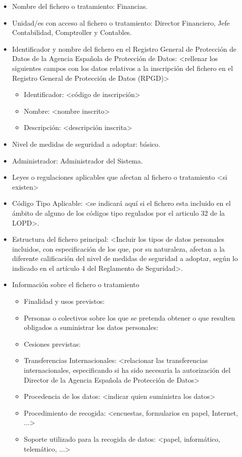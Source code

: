 \documentclass[a4paper,11pt,bibtotoc,noliststotoc]{scrbook}
\begin{document}
\begin{itemize}
\item Nombre del fichero o tratamiento: Financias.

\item Unidad/es con acceso al fichero o tratamiento: Director Financiero, Jefe Contabilidad, Comptroller y Contables.

\item Identificador y nombre del fichero en el Registro General de Protección de Datos de la Agencia Española de Protección de Datos: <rellenar los siguientes campos con los datos relativos a la inscripción del fichero en el Registro General de Protección de Datos (RPGD)>
	\begin{itemize}
	\item Identificador: <código de inscripción>
	\item Nombre: <nombre inscrito>
	\item Descripción: <descripción inscrita>
	\end{itemize}

\item Nivel de medidas de seguridad a adoptar: básico.

\item Administrador: Administrador del Sistema.

\item Leyes o regulaciones aplicables que afectan al fichero o tratamiento <si existen>

\item Código Tipo Aplicable: <se indicará aquí si el fichero esta incluido en el ámbito de alguno de los códigos tipo regulados por el articulo 32 de la LOPD>.

\item Estructura del fichero principal: <Incluir los tipos de datos personales incluidos, con especificación de los que, por su naturaleza, afectan a la diferente calificación del nivel de medidas de seguridad a adoptar, según lo indicado en el artículo 4 del Reglamento de Seguridad>.

\item Información sobre el fichero o tratamiento
	\begin{itemize}
	\item Finalidad y usos previstos:
	\item Personas o colectivos sobre los que se pretenda obtener o que resulten obligados a suministrar los datos personales:
	\item Cesiones previstas:
	\item Transferencias Internacionales: <relacionar las transferencias internacionales, especificando si ha sido necesaria la autorización del Director de la Agencia Española de Protección de Datos>
	\item Procedencia de los datos: <indicar quien suministra los datos>
	\item Procedimiento de recogida: <encuestas, formularios en papel, Internet, ...>
	\item Soporte utilizado para la recogida de datos: <papel, informático, telemático, ...>
	\end{itemize}


\end{itemize}
\end{document}
